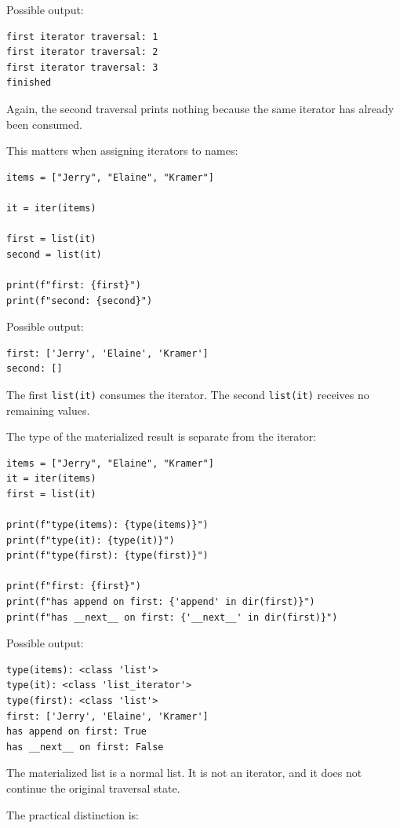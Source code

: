 Possible output:

\begin{verbatim}
first iterator traversal: 1
first iterator traversal: 2
first iterator traversal: 3
finished
\end{verbatim}

Again, the second traversal prints nothing because the same iterator has already been consumed.

This matters when assigning iterators to names:

\begin{verbatim}
items = ["Jerry", "Elaine", "Kramer"]

it = iter(items)

first = list(it)
second = list(it)

print(f"first: {first}")
print(f"second: {second}")
\end{verbatim}

Possible output:

\begin{verbatim}
first: ['Jerry', 'Elaine', 'Kramer']
second: []
\end{verbatim}

The first \texttt{list(it)} consumes the iterator. The second \texttt{list(it)} receives no remaining values.

The type of the materialized result is separate from the iterator:

\begin{verbatim}
items = ["Jerry", "Elaine", "Kramer"]
it = iter(items)
first = list(it)

print(f"type(items): {type(items)}")
print(f"type(it): {type(it)}")
print(f"type(first): {type(first)}")

print(f"first: {first}")
print(f"has append on first: {'append' in dir(first)}")
print(f"has __next__ on first: {'__next__' in dir(first)}")
\end{verbatim}

Possible output:

\begin{verbatim}
type(items): <class 'list'>
type(it): <class 'list_iterator'>
type(first): <class 'list'>
first: ['Jerry', 'Elaine', 'Kramer']
has append on first: True
has __next__ on first: False
\end{verbatim}

The materialized list is a normal list. It is not an iterator, and it does not continue the original traversal state.

The practical distinction is:

